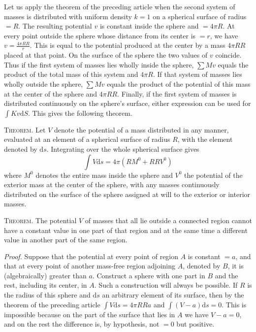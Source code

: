 Let us apply the theorem of the preceding article when the second system of masses is distributed with uniform density $k=1$ on a spherical surface of radius $=R$. The resulting potential $v$ is constant inside the sphere and $=4\pi R$. At every point outside the sphere whose distance from its center is $=r$, we have $v=\frac{4\pi RR}{r}$. This is equal to the potential produced at the center by a mass $4\pi RR$ placed at that point. On the surface of the sphere the two values of $v$ coincide. Thus if the first system of masses lies wholly inside the sphere, $\sum Mv$ equals the product of the total mass of this system and $4\pi R$. If that system of masses lies wholly outside the sphere, $\sum Mv$ equals the product of the potential of this mass at the center of the sphere and $4\pi RR$. Finally, if the first system of masses is distributed continuously on the sphere's surface, either expression can be used for $\int Kv\mathrm dS$. This gives the following theorem.

\textsc{Theorem.} Let $V$ denote the potential of a mass distributed in any manner, evaluated at an element of a spherical surface of radius $R$, with the element denoted by $\mathrm ds$. Integrating over the whole spherical surface gives
\[
\int V\mathrm ds=4\pi(RM^0+RRV^0)
\]
where $M^0$ denotes the entire mass inside the sphere and $V^0$ the potential of the exterior mass at the center of the sphere, with any masses continuously distributed on the surface of the sphere assigned at will to the exterior or interior masses.

%
\textsc{Theorem.} The potential $V$ of masses that all lie outside a connected region cannot have a constant value in one part of that region and at the same time a different value in another part of the same region.

\textit{Proof.} Suppose that the potential at every point of region $A$ is constant $=a$, and that at every point of another mass-free region adjoining $A$, denoted by $B$, it is (algebraically) greater than $a$. Construct a sphere with one part in $B$ and the rest, including its center, in $A$. Such a construction will always be possible. If $R$ is the radius of this sphere and $\mathrm ds$ an arbitrary element of its surface, then by the theorem of the preceding article $\int V\mathrm ds=4\pi RRa$ and $\int(V-a)\mathrm ds=0$. This is impossible because on the part of the surface that lies in $A$ we have $V-a=0$, and on the rest the difference is, by hypothesis, not $=0$ but positive.

